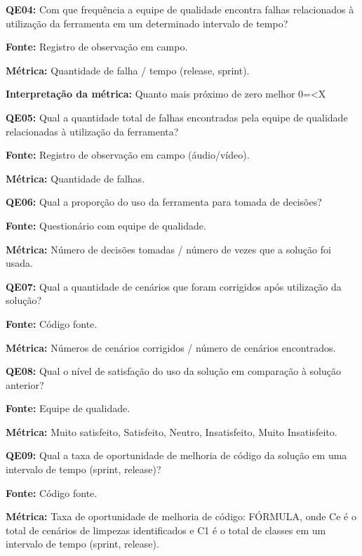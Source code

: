 
\textbf{QE04: } Com que frequência a equipe de qualidade encontra falhas relacionados à utilização da ferramenta em um determinado intervalo de tempo?

\textbf{Fonte:} Registro de observação em campo.

\textbf{Métrica:} Quantidade de falha / tempo (release, sprint).

\textbf{Interpretação da métrica:} Quanto mais próximo de zero melhor 0=<X


\textbf{QE05: } Qual a quantidade total de falhas encontradas pela equipe de qualidade relacionadas à utilização da ferramenta?

\textbf{Fonte:} Registro de observação em campo (áudio/vídeo).

\textbf{Métrica:} Quantidade de falhas.


\textbf{QE06: } Qual a proporção do uso da ferramenta para tomada de decisões?

\textbf{Fonte:} Questionário com equipe de qualidade.

\textbf{Métrica:} Número de decisões tomadas / número de vezes que a solução foi usada.



\textbf{QE07: } Qual a quantidade de cenários que foram corrigidos após utilização da solução?

\textbf{Fonte:} Código fonte.

\textbf{Métrica:} Números de cenários corrigidos / número de cenários encontrados.


\textbf{QE08: } Qual o nível de satisfação do uso da solução em comparação à solução anterior? 

\textbf{Fonte:} Equipe de qualidade.

\textbf{Métrica:} Muito satisfeito, Satisfeito, Neutro, Insatisfeito, Muito Insatisfeito.


\textbf{QE09: } Qual a taxa de oportunidade de melhoria de código da solução em uma intervalo de tempo (sprint, release)? 

\textbf{Fonte:} Código fonte.

\textbf{Métrica:} Taxa de oportunidade de melhoria de código: FÓRMULA, onde Ce é o total de cenários de limpezas identificados e C1 é o total de classes em um intervalo de tempo (sprint, release).

